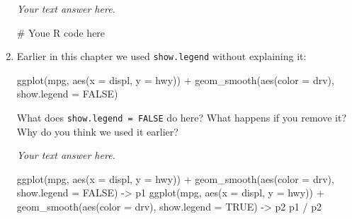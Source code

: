 \documentclass[
  letterpaper,
  DIV=11,
  numbers=noendperiod]{scrreprt}
\newenvironment{Shaded}{\begin{snugshade}}{\end{snugshade}}
\newcommand{\AttributeTok}[1]{\textcolor[rgb]{0.40,0.45,0.13}{#1}}
\newcommand{\CommentTok}[1]{\textcolor[rgb]{0.37,0.37,0.37}{#1}}
\newcommand{\ConstantTok}[1]{\textcolor[rgb]{0.56,0.35,0.01}{#1}}
\newcommand{\FunctionTok}[1]{\textcolor[rgb]{0.28,0.35,0.67}{#1}}
\newcommand{\NormalTok}[1]{\textcolor[rgb]{0.00,0.23,0.31}{#1}}
\newcommand{\OtherTok}[1]{\textcolor[rgb]{0.00,0.23,0.31}{#1}}
\newcommand{\SpecialCharTok}[1]{\textcolor[rgb]{0.37,0.37,0.37}{#1}}
\begin{document}
\begin{enumerate}
\begin{tcolorbox}
  \emph{Your text answer here.}

\begin{Shaded}
\begin{Highlighting}[]
\CommentTok{\# Youe R code here}
\end{Highlighting}
\end{Shaded}

  \end{tcolorbox}
\item
  Earlier in this chapter we used \texttt{show.legend} without
  explaining it:

\begin{Shaded}
\begin{Highlighting}[]
\FunctionTok{ggplot}\NormalTok{(mpg, }\FunctionTok{aes}\NormalTok{(}\AttributeTok{x =}\NormalTok{ displ, }\AttributeTok{y =}\NormalTok{ hwy)) }\SpecialCharTok{+}
  \FunctionTok{geom\_smooth}\NormalTok{(}\FunctionTok{aes}\NormalTok{(}\AttributeTok{color =}\NormalTok{ drv), }\AttributeTok{show.legend =} \ConstantTok{FALSE}\NormalTok{)}
\end{Highlighting}
\end{Shaded}

  What does \texttt{show.legend\ =\ FALSE} do here? What happens if you
  remove it? Why do you think we used it earlier?

  \begin{tcolorbox}[enhanced jigsaw, breakable, bottomtitle=1mm, left=2mm, colback=white, toprule=.15mm, leftrule=.75mm, colframe=quarto-callout-note-color-frame, colbacktitle=quarto-callout-note-color!10!white, title={Answer}, coltitle=black, toptitle=1mm, bottomrule=.15mm, opacitybacktitle=0.6, arc=.35mm, rightrule=.15mm, titlerule=0mm, opacityback=0]

  \emph{Your text answer here.}

\begin{Shaded}
\begin{Highlighting}[]
\FunctionTok{ggplot}\NormalTok{(mpg, }\FunctionTok{aes}\NormalTok{(}\AttributeTok{x =}\NormalTok{ displ, }\AttributeTok{y =}\NormalTok{ hwy)) }\SpecialCharTok{+}
  \FunctionTok{geom\_smooth}\NormalTok{(}\FunctionTok{aes}\NormalTok{(}\AttributeTok{color =}\NormalTok{ drv), }\AttributeTok{show.legend =} \ConstantTok{FALSE}\NormalTok{) }\OtherTok{{-}\textgreater{}}\NormalTok{ p1}
\FunctionTok{ggplot}\NormalTok{(mpg, }\FunctionTok{aes}\NormalTok{(}\AttributeTok{x =}\NormalTok{ displ, }\AttributeTok{y =}\NormalTok{ hwy)) }\SpecialCharTok{+}
  \FunctionTok{geom\_smooth}\NormalTok{(}\FunctionTok{aes}\NormalTok{(}\AttributeTok{color =}\NormalTok{ drv), }\AttributeTok{show.legend =} \ConstantTok{TRUE}\NormalTok{) }\OtherTok{{-}\textgreater{}}\NormalTok{ p2}
\NormalTok{p1 }\SpecialCharTok{/}\NormalTok{ p2}
\end{Highlighting}
\end{Shaded}


\end{tcolorbox}
\end{enumerate}
\end{document}
